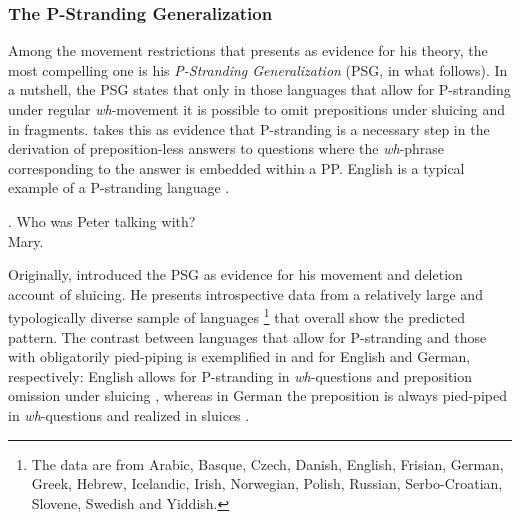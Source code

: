 \subsubsection{The P-Stranding Generalization}\label{sec:pstranding-background-psg}
Among the movement restrictions that \citet{merchant2004} presents as evidence for his theory, the most compelling one is his \textit{P-Stranding Generalization} (PSG, in what follows). In a nutshell, the PSG states that only in those languages that allow for P-stranding under regular \textit{wh}-movement it is possible to omit prepositions under sluicing and in fragments. \citeauthor{merchant2004} takes this as evidence that P-stranding is a necessary step in the derivation of preposition-less answers to questions where the \textit{wh}-phrase corresponding to the answer is embedded within a PP. English is a typical example of a P-stranding language \Next. 

\ex. Who was Peter talking with?\hfill\citep[685]{merchant2004}\\
Mary.

Originally, \citet{merchant2001} introduced the PSG as evidence for his movement and deletion account of sluicing. He presents introspective data from a relatively large and typologically diverse sample of languages%
%
\footnote{The data are from Arabic, Basque, Czech, Danish, English, Frisian, German, Greek, Hebrew, Icelandic, Irish, Norwegian, Polish, Russian,  Serbo-Croatian, Slovene, Swedish and Yiddish.}\afterfn%
%
that overall show the predicted pattern. The contrast between languages that allow for P-stranding and those with obligatorily pied-piping is exemplified in \Next and \NNext for English and German, respectively: English allows for P-stranding in \textit{wh}-questions \Next[a] and preposition omission under sluicing \Next[b], whereas in German the preposition is always pied-piped in \textit{wh}-questions \NNext[a] and realized in sluices \NNext[b].

